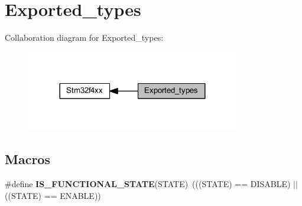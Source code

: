 \hypertarget{group___exported__types}{}\section{Exported\+\_\+types}
\label{group___exported__types}
Collaboration diagram for Exported\+\_\+types\+:
\nopagebreak
\begin{figure}[H]
\begin{center}
\leavevmode
\includegraphics[width=264pt]{group___exported__types}
\end{center}
\end{figure}
\subsection*{Macros}
\begin{DoxyCompactItemize}
\item 
\mbox{\label{group___exported__types_gaffaf7c3f537d7a3370b1bbdda67a2bf6}} 
\#define {\bfseries I\+S\+\_\+\+F\+U\+N\+C\+T\+I\+O\+N\+A\+L\+\_\+\+S\+T\+A\+TE}(S\+T\+A\+TE)~(((S\+T\+A\+TE) == D\+I\+S\+A\+B\+LE) $\vert$$\vert$ ((S\+T\+A\+TE) == E\+N\+A\+B\+LE))
\end{DoxyCompactItemize}
